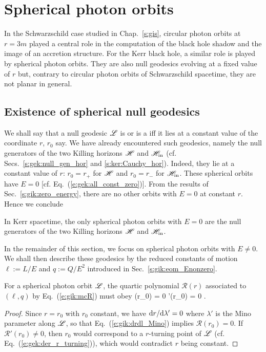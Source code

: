 
\section{Spherical photon orbits} \label{s:gik:spherical_orbits}

In the Schwarzschild case studied in Chap.~\ref{s:gis}, circular photon
orbits at $r=3m$ played a central role in the computation of
the black hole shadow and the image of an accretion structure.
For the Kerr black hole, a similar role is played by spherical photon
orbits. They are also null geodesics evolving at a fixed value of $r$ but, contrary
to circular photon orbits of Schwarzschild spacetime, they are not planar
in general.


\subsection{Existence of spherical null geodesics} \label{s:gik:spher_existence}

We shall say that a null geodesic $\mathscr{L}$ is  or
is a  iff it lies at a constant value of the coordinate $r$, $r_0$ say.
We have already encountered such geodesics, namely the null generators of the two Killing horizons
$\mathscr{H}$ and $\mathscr{H}_{\rm in}$ (cf. Secs.~\ref{s:gek:null_gen_hor} and \ref{s:ker:Cauchy_hor}).
Indeed, they lie at a constant value of $r$: $r_0 = r_+$ for
$\mathscr{H}$ and $r_0 = r_-$ for $\mathscr{H}_{\rm in}$.  These spherical orbits have $E=0$
[cf. Eq.~(\ref{e:gek:all_const_zero})].
From the results of Sec.~\ref{s:gik:zero_energy}, there are no other orbits with $E=0$ at constant $r$.
Hence we conclude
\begin{greybox}
In Kerr spacetime, the only spherical photon orbits with $E=0$ are the null generators of the two Killing horizons $\mathscr{H}$ and $\mathscr{H}_{\rm in}$.
\end{greybox}
In the remainder of this section, we focus on spherical photon orbits with $E\neq 0$.
We shall then describe these geodesics by the reduced constants of motion $\ell := L/E$
and $q := Q/E^2$ introduced in Sec.~\ref{s:gik:eom_Enonzero}.

For a spherical photon orbit $\mathscr{L}$,
the quartic polynomial $\mathcal{R}(r)$ associated to $(\ell,q)$ by Eq.~(\ref{e:gik:mcR})
must obey
\be \label{e:gik:R_Rp_r0_zero}
    (r_0) = 0 \qand {}'(r_0) = 0 .
\ee
\begin{proof}
Since $r=r_0$ with $r_0$ constant, we have $\mathrm{d} r/\mathrm{d}\lambda' = 0$ where $\lambda'$ is the Mino parameter along $\mathscr{L}$, so
that Eq.~(\ref{e:gik:drdl_Mino}) implies $\mathcal{R}(r_0) = 0$. If $\mathcal{R}'(r_0) \neq 0$,
then $r_0$ would correspond to a $r$-turning point of $\mathscr{L}$  (cf. Eq.~(\ref{e:gek:der_r_turning})),
which would contradict $r$ being constant.
\end{proof}

